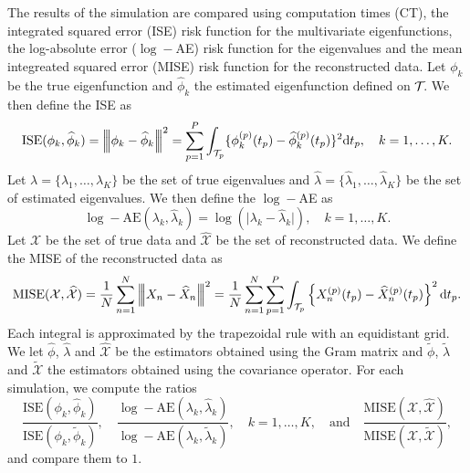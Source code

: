 The results of the simulation are compared using computation times (CT), the integrated squared error (ISE) risk function for the multivariate eigenfunctions, the log-absolute error ($\log-$AE) risk function for the eigenvalues and the mean integreated squared error (MISE) risk function for the reconstructed data. Let $\phi_k$ be the true eigenfunction and $\widehat{\phi}_k$ the estimated eigenfunction defined on $\mathcal{T}_{}$. We then define the ISE as 
\begin{equation}\label{eq:ise_eigenfunctions}
    \text{ISE}(\phi_k, \widehat{\phi}_k) = \left|\!\left|\!\left|\phi_k - \widehat{\phi}_k\right|\!\right|\!\right|^2 = \sum_{p = 1}^P \int_{\mathcal{T}_{p}} \{\phi^{(p)}_k(t_p) - \widehat{\phi}^{(p)}_k(t_p)\}^2 {\rm d} t_p, \quad k = 1, \dots, K.
\end{equation}
Let $\lambda = \{\lambda_1, \dots, \lambda_K\}$ be the set of true eigenvalues and $\widehat{\lambda} = \{\widehat{\lambda}_1, \dots, \widehat{\lambda}_K\}$ be the set of estimated eigenvalues. We then define the $\log-$AE as 
\begin{equation}\label{eq:mse_eigenvalues}
    \log-\text{AE}(\lambda_k, \widehat{\lambda}_k) = \log(\lvert \lambda_k - \widehat{\lambda}_k\rvert), \quad k = 1, \dots, K.
\end{equation}
Let $\mathcal{X}$ be the set of true data and $\widehat{\mathcal{X}}$ be the set of reconstructed data. We define the MISE of the reconstructed data as
\begin{equation}\label{eq:mise_reconstructed_data}
    \text{MISE}(\mathcal{X}, \widehat{\mathcal{X}}) = \frac{1}{N}\sum_{n = 1}^N \left|\!\left|\!\left|X_n - \widehat{X}_n\right|\!\right|\!\right|^2 = \frac{1}{N}\sum_{n = 1}^N \sum_{p = 1}^P \int_{\mathcal{T}_{p}} \left\{X_n^{(p)}(t_p) - \widehat{X}_n^{(p)}(t_p) \right\}^2 {\rm d} t_p.
\end{equation}
Each integral is approximated by the trapezoidal rule with an equidistant grid. We let $\widehat{\phi}$, $\widehat{\lambda}$ and $\widehat{\mathcal{X}}$ be the estimators obtained using the Gram matrix and $\widetilde{\phi}$, $\widetilde{\lambda}$ and $\widetilde{\mathcal{X}}$ the estimators obtained using the covariance operator. For each simulation, we compute the ratios
\begin{equation}
    \frac{\text{ISE}(\phi_k, \widehat{\phi}_k)}{\text{ISE}(\phi_k, \widetilde{\phi}_k)}, \quad \frac{\log -\text{AE}(\lambda_k, \widehat{\lambda}_k)}{\log-\text{AE}(\lambda_k, \widetilde{\lambda}_k)},\quad k = 1, \dots, K, \quad\text{and}\quad \frac{\text{MISE}(\mathcal{X}, \widehat{\mathcal{X}})}{\text{MISE}(\mathcal{X}, \widetilde{\mathcal{X}})},
\end{equation}
and compare them to $1$.

